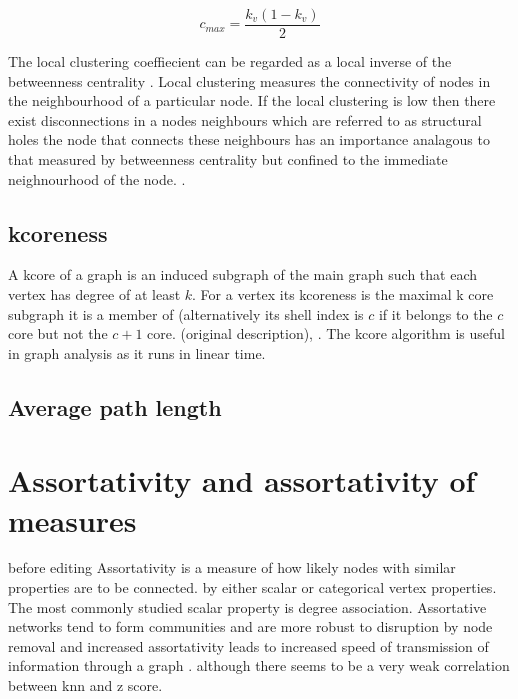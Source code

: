 \begin{equation}
c_{max} = \frac{k_v(1-k_v)}{2}
\end{equation}

The local clustering coeffiecient can be regarded as a local inverse of the betweenness centrality . Local clustering measures the connectivity of nodes in the neighbourhood of a particular node. If the local clustering is low then there exist disconnections in a nodes neighbours which are referred to as structural holes  the node that connects these neighbours has an importance analagous to that measured by betweenness centrality but confined to the immediate neighnourhood of the node. .






\subsection{kcoreness}

A kcore of a graph is an induced subgraph of the main graph such that each vertex has degree of at least $k$. For a vertex its kcoreness is the maximal k core subgraph it is a member of (alternatively its shell index is $c$ if it belongs to the $c$ core but not the $c+1$ core. \cite{seidman1983network} (original description), \cite{alvarez2006large}. The kcore algorithm is useful in graph analysis as it runs in linear time. 

\subsection{Average path length}
\label{sec:Centrality intro average path length}

\section{Assortativity and assortativity of measures}
before editing
Assortativity is a measure of how likely nodes with similar properties are to be connected. \cite{newman2002assortative} by either scalar or categorical vertex properties. The most commonly studied scalar property is degree association. Assortative networks tend to form communities and are more robust to disruption by node removal  \cite{newman2002assortative} and increased assortativity leads to increased speed of transmission of information through a graph \cite{noldus2015assortativity}.  although there seems to be a very weak correlation between knn and z score. 
